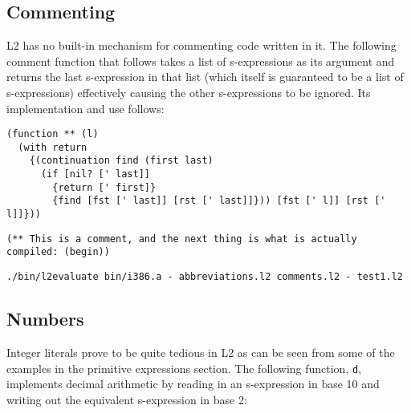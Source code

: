 \documentclass[twocolumn,landscape]{article}
\begin{document}
    \subsection{Commenting}\label{sec:commenting}
      L2 has no built-in mechanism for commenting code written in it. The following comment function that follows takes a list of s-expressions as its argument and returns the last s-expression in that list (which itself is guaranteed to be a list of s-expressions) effectively causing the other s-expressions to be ignored. Its implementation and use follows:

      \begin{lstlisting}[caption={comments.l2}]
(function ** (l)
  (with return
    {(continuation find (first last)
      (if [nil? [' last]]
        {return [' first]}
        {find [fst [' last]] [rst [' last]]})) [fst [' l]] [rst [' l]]}))
      \end{lstlisting}

      \begin{lstlisting}[caption={test1.l2}]
(** This is a comment, and the next thing is what is actually compiled: (begin))
      \end{lstlisting}
      \begin{lstlisting}[caption={shell}]
./bin/l2evaluate bin/i386.a - abbreviations.l2 comments.l2 - test1.l2
      \end{lstlisting}

    \subsection{Numbers}\label{sec:numbers}
      Integer literals prove to be quite tedious in L2 as can be seen from some of the examples in the primitive expressions section. The following function, \lstinline{d}, implements decimal arithmetic by reading in an s-expression in base 10 and writing out the equivalent s-expression in base 2:
\end{document}
